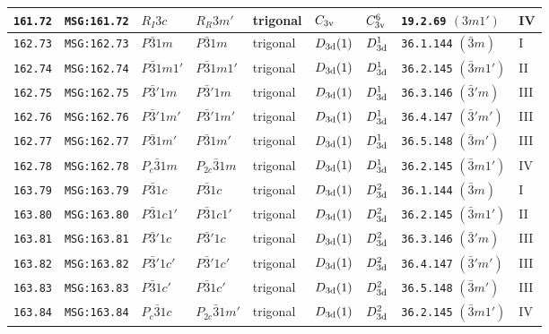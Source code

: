 \documentclass[fleqn,10pt]{jsarticle}
\begin{document}
\begin{center}
\begin{longtable}{lllllllll}
\texttt{161.72} & \texttt{MSG:161.72} & $R_{I}3c$ & $R_{R}3m'$ & trigonal & $C_{\rm 3v}$ & $C_{\rm 3v}^{6}$ & \texttt{19.2.69} $(3m1')$ & IV \\ \hline
\texttt{162.73} & \texttt{MSG:162.73} & $P\bar{3}1m$ & $P\bar{3}1m$ & trigonal & $D_{\rm 3d}(1)$ & $D_{\rm 3d}^{1}$ & \texttt{36.1.144} $(\bar{3}m)$ & I \\
\texttt{162.74} & \texttt{MSG:162.74} & $P\bar{3}1m1'$ & $P\bar{3}1m1'$ & trigonal & $D_{\rm 3d}(1)$ & $D_{\rm 3d}^{1}$ & \texttt{36.2.145} $(\bar{3}m1')$ & II \\
\texttt{162.75} & \texttt{MSG:162.75} & $P\bar{3}'1m$ & $P\bar{3}'1m$ & trigonal & $D_{\rm 3d}(1)$ & $D_{\rm 3d}^{1}$ & \texttt{36.3.146} $(\bar{3}'m)$ & III \\
\texttt{162.76} & \texttt{MSG:162.76} & $P\bar{3}'1m'$ & $P\bar{3}'1m'$ & trigonal & $D_{\rm 3d}(1)$ & $D_{\rm 3d}^{1}$ & \texttt{36.4.147} $(\bar{3}'m')$ & III \\
\texttt{162.77} & \texttt{MSG:162.77} & $P\bar{3}1m'$ & $P\bar{3}1m'$ & trigonal & $D_{\rm 3d}(1)$ & $D_{\rm 3d}^{1}$ & \texttt{36.5.148} $(\bar{3}m')$ & III \\
\texttt{162.78} & \texttt{MSG:162.78} & $P_{c}\bar{3}1m$ & $P_{2c}\bar{3}1m$ & trigonal & $D_{\rm 3d}(1)$ & $D_{\rm 3d}^{1}$ & \texttt{36.2.145} $(\bar{3}m1')$ & IV \\ \hline
\texttt{163.79} & \texttt{MSG:163.79} & $P\bar{3}1c$ & $P\bar{3}1c$ & trigonal & $D_{\rm 3d}(1)$ & $D_{\rm 3d}^{2}$ & \texttt{36.1.144} $(\bar{3}m)$ & I \\
\texttt{163.80} & \texttt{MSG:163.80} & $P\bar{3}1c1'$ & $P\bar{3}1c1'$ & trigonal & $D_{\rm 3d}(1)$ & $D_{\rm 3d}^{2}$ & \texttt{36.2.145} $(\bar{3}m1')$ & II \\
\texttt{163.81} & \texttt{MSG:163.81} & $P\bar{3}'1c$ & $P\bar{3}'1c$ & trigonal & $D_{\rm 3d}(1)$ & $D_{\rm 3d}^{2}$ & \texttt{36.3.146} $(\bar{3}'m)$ & III \\
\texttt{163.82} & \texttt{MSG:163.82} & $P\bar{3}'1c'$ & $P\bar{3}'1c'$ & trigonal & $D_{\rm 3d}(1)$ & $D_{\rm 3d}^{2}$ & \texttt{36.4.147} $(\bar{3}'m')$ & III \\
\texttt{163.83} & \texttt{MSG:163.83} & $P\bar{3}1c'$ & $P\bar{3}1c'$ & trigonal & $D_{\rm 3d}(1)$ & $D_{\rm 3d}^{2}$ & \texttt{36.5.148} $(\bar{3}m')$ & III \\
\texttt{163.84} & \texttt{MSG:163.84} & $P_{c}\bar{3}1c$ & $P_{2c}\bar{3}1m'$ & trigonal & $D_{\rm 3d}(1)$ & $D_{\rm 3d}^{2}$ & \texttt{36.2.145} $(\bar{3}m1')$ & IV \\ \hline

\end{longtable}
\end{center}
\end{document}
